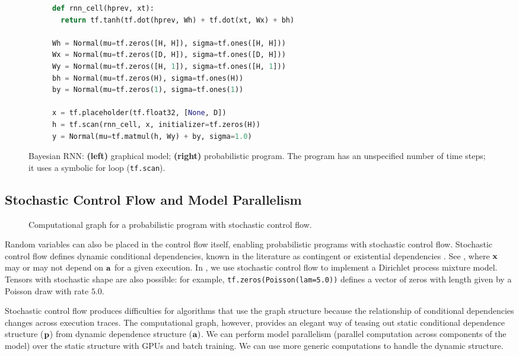 \begin{figure}[tb]
\begin{subfigure}{0.35\columnwidth}
  \centering
  
\end{subfigure}%
\begin{subfigure}{0.6\columnwidth}
\begin{lstlisting}[language=python]
def rnn_cell(hprev, xt):
  return tf.tanh(tf.dot(hprev, Wh) + tf.dot(xt, Wx) + bh)

Wh = Normal(mu=tf.zeros([H, H]), sigma=tf.ones([H, H]))
Wx = Normal(mu=tf.zeros([D, H]), sigma=tf.ones([D, H]))
Wy = Normal(mu=tf.zeros([H, 1]), sigma=tf.ones([H, 1]))
bh = Normal(mu=tf.zeros(H), sigma=tf.ones(H))
by = Normal(mu=tf.zeros(1), sigma=tf.ones(1))

x = tf.placeholder(tf.float32, [None, D])
h = tf.scan(rnn_cell, x, initializer=tf.zeros(H))
y = Normal(mu=tf.matmul(h, Wy) + by, sigma=1.0)
\end{lstlisting}
\end{subfigure}
\caption{Bayesian \gls{RNN}: \textbf{(left)} graphical model;
  \textbf{(right)} probabilistic program. The program has an unspecified number
  of time steps; it uses a symbolic for loop (\texttt{tf.scan}). }
\label{fig:bayesian_rnn}
\end{figure}

\subsection{Stochastic Control Flow and Model Parallelism}

\begin{figure}[!htb]
  \centering
  
\caption{Computational graph for a probabilistic program with stochastic control flow.
}
\label{fig:dynamic}
\end{figure}

Random variables can also be placed in the control flow itself,
enabling probabilistic programs with stochastic control flow.
Stochastic control flow defines dynamic conditional dependencies,
known in the literature as contingent or existential dependencies
\citep{mansinghka2014venture,wu2016swift}. See ,
where $\boldsymbol{\mathbf{x}}$ may or may not depend on $\boldsymbol{\mathbf{a}}$ for a given execution.
In , we use stochastic control flow
to implement a Dirichlet process mixture model.
Tensors with stochastic shape are also possible: for
example, \texttt{tf.zeros(Poisson(lam=5.0))} defines a vector of zeros
with length given by a Poisson draw with rate $5.0$.

Stochastic control flow produces difficulties for algorithms that use
the graph structure because the relationship of conditional
dependencies changes across execution traces. The computational
graph, however, provides an elegant way of teasing out static
conditional dependence structure ($\boldsymbol{\mathbf{p}}$) from dynamic dependence
structure ($\boldsymbol{\mathbf{a}})$. We can perform model parallelism (parallel
computation across components of the model) over the static structure
with \glspl{GPU} and batch training. We can use more generic
computations to handle the dynamic structure.

